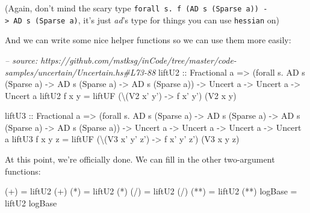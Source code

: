 \documentclass[]{article}
\newenvironment{Shaded}{}{}
\newcommand{\DataTypeTok}[1]{\textcolor[rgb]{0.56,0.13,0.00}{{#1}}}
\newcommand{\CommentTok}[1]{\textcolor[rgb]{0.38,0.63,0.69}{\textit{{#1}}}}
\newcommand{\OtherTok}[1]{\textcolor[rgb]{0.00,0.44,0.13}{{#1}}}
\newcommand{\FunctionTok}[1]{\textcolor[rgb]{0.02,0.16,0.49}{{#1}}}
\newcommand{\NormalTok}[1]{{#1}}
\begin{document}
(Again, don't mind the scary type
\texttt{forall\ s.\ f\ (AD\ s\ (Sparse\ a))\ -\textgreater{}\ AD\ s\ (Sparse\ a)},
it's just \emph{ad}'s type for things you can use
\texttt{hessian\textquotesingle{}} on)

And we can write some nice helper functions so we can use them more
easily:

\begin{Shaded}
\begin{Highlighting}[]
\CommentTok{-- source: https://github.com/mstksg/inCode/tree/master/code-samples/uncertain/Uncertain.hs#L73-88}
\NormalTok{liftU2}
\OtherTok{    ::} \DataTypeTok{Fractional} \NormalTok{a}
    \OtherTok{=>} \NormalTok{(forall s}\FunctionTok{.} \DataTypeTok{AD} \NormalTok{s (}\DataTypeTok{Sparse} \NormalTok{a) }\OtherTok{->} \DataTypeTok{AD} \NormalTok{s (}\DataTypeTok{Sparse} \NormalTok{a) }\OtherTok{->} \DataTypeTok{AD} \NormalTok{s (}\DataTypeTok{Sparse} \NormalTok{a))}
    \OtherTok{->} \DataTypeTok{Uncert} \NormalTok{a}
    \OtherTok{->} \DataTypeTok{Uncert} \NormalTok{a}
    \OtherTok{->} \DataTypeTok{Uncert} \NormalTok{a}
\NormalTok{liftU2 f x y }\FunctionTok{=} \NormalTok{liftUF (\textbackslash{}(}\DataTypeTok{V2} \NormalTok{x' y') }\OtherTok{->} \NormalTok{f x' y') (}\DataTypeTok{V2} \NormalTok{x y)}

\NormalTok{liftU3}
\OtherTok{    ::} \DataTypeTok{Fractional} \NormalTok{a}
    \OtherTok{=>} \NormalTok{(forall s}\FunctionTok{.} \DataTypeTok{AD} \NormalTok{s (}\DataTypeTok{Sparse} \NormalTok{a) }\OtherTok{->} \DataTypeTok{AD} \NormalTok{s (}\DataTypeTok{Sparse} \NormalTok{a) }\OtherTok{->} \DataTypeTok{AD} \NormalTok{s (}\DataTypeTok{Sparse} \NormalTok{a) }\OtherTok{->} \DataTypeTok{AD} \NormalTok{s (}\DataTypeTok{Sparse} \NormalTok{a))}
    \OtherTok{->} \DataTypeTok{Uncert} \NormalTok{a}
    \OtherTok{->} \DataTypeTok{Uncert} \NormalTok{a}
    \OtherTok{->} \DataTypeTok{Uncert} \NormalTok{a}
    \OtherTok{->} \DataTypeTok{Uncert} \NormalTok{a}
\NormalTok{liftU3 f x y z }\FunctionTok{=} \NormalTok{liftUF (\textbackslash{}(}\DataTypeTok{V3} \NormalTok{x' y' z') }\OtherTok{->} \NormalTok{f x' y' z') (}\DataTypeTok{V3} \NormalTok{x y z)}
\end{Highlighting}
\end{Shaded}

At this point, we're officially done. We can fill in the other
two-argument functions:

\begin{Shaded}
\begin{Highlighting}[]
\NormalTok{(}\FunctionTok{+}\NormalTok{)     }\FunctionTok{=} \NormalTok{liftU2 (}\FunctionTok{+}\NormalTok{)}
\NormalTok{(}\FunctionTok{*}\NormalTok{)     }\FunctionTok{=} \NormalTok{liftU2 (}\FunctionTok{*}\NormalTok{)}
\NormalTok{(}\FunctionTok{/}\NormalTok{)     }\FunctionTok{=} \NormalTok{liftU2 (}\FunctionTok{/}\NormalTok{)}
\NormalTok{(}\FunctionTok{**}\NormalTok{)    }\FunctionTok{=} \NormalTok{liftU2 (}\FunctionTok{**}\NormalTok{)}
\NormalTok{logBase }\FunctionTok{=} \NormalTok{liftU2 logBase}
\end{Highlighting}
\end{Shaded}
\end{document}
